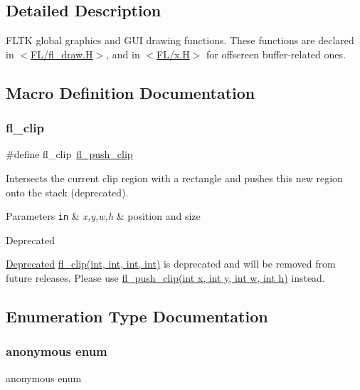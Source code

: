 \subsection{Detailed Description}
F\+L\+TK global graphics and G\+UI drawing functions. These functions are declared in $<$\hyperlink{fl__draw_8_h}{F\+L/fl\+\_\+draw.\+H}$>$, and in $<$\hyperlink{x_8_h}{F\+L/x.\+H}$>$ for offscreen buffer-\/related ones. 

\subsection{Macro Definition Documentation}
\mbox{\label{group__fl__drawings_ga0061bafa4252431de247713975e4c3ef}} 
\subsubsection{\texorpdfstring{fl\+\_\+clip}{fl\_clip}}
{\footnotesize\ttfamily \#define fl\+\_\+clip~\hyperlink{group__fl__drawings_gabe60242ba3b975800717b95cb6bc06d2}{fl\+\_\+push\+\_\+clip}}

Intersects the current clip region with a rectangle and pushes this new region onto the stack (deprecated). 
\begin{DoxyParams}[1]{Parameters}
\mbox{\tt in}  & {\em x,y,w,h} & position and size \\
\hline
\end{DoxyParams}
\begin{DoxyRefDesc}{Deprecated}
\item[\hyperlink{deprecated__deprecated000003}{Deprecated}]\hyperlink{group__fl__drawings_ga0061bafa4252431de247713975e4c3ef}{fl\+\_\+clip(int, int, int, int)} is deprecated and will be removed from future releases. Please use \hyperlink{group__fl__drawings_gabe60242ba3b975800717b95cb6bc06d2}{fl\+\_\+push\+\_\+clip(int x, int y, int w, int h)} instead. \end{DoxyRefDesc}


\subsection{Enumeration Type Documentation}
\mbox{\label{group__fl__drawings_gabc6126af1d45847bc59afa0aa3216b04}} 
\subsubsection{\texorpdfstring{anonymous enum}{anonymous enum}}
{\footnotesize\ttfamily anonymous enum}

